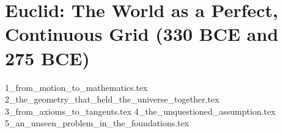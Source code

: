 \section{Euclid: The World as a Perfect, Continuous Grid (330 BCE and 275 BCE)}

{1_from_motion_to_mathematics.tex}
{2_the_geometry_that_held_the_universe_together.tex}
{3_from_axioms_to_tangents.tex}
{4_the_unquestioned_assumption.tex}
{5_an_unseen_problem_in_the_foundations.tex}